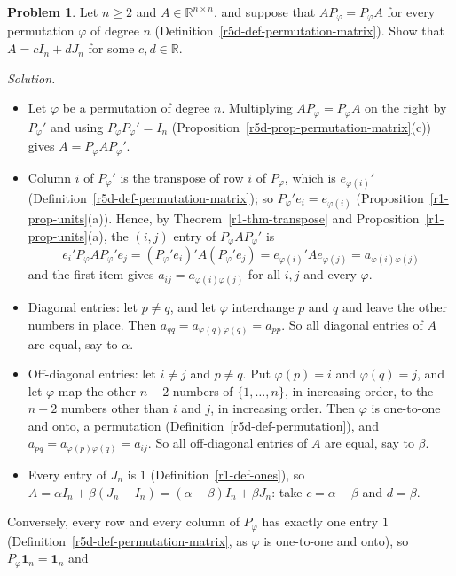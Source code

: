 \documentclass[12pt]{article}
\newcommand{\R}{\mathbb R}
\newcommand{\one}{\mathbf 1}
\theoremstyle{definition}
\newtheorem{problem}{Problem}
\newenvironment{solution}{\par\noindent\textit{Solution.}\ }{\par\smallskip}
\begin{document}
\begin{problem}\label{r5d-ex-pr-perm-commute}
Let \(n\geqslant2\) and \(A\in\R^{n\times n}\), and suppose that \(AP_\varphi=P_\varphi A\) for every permutation \(\varphi\) of
degree \(n\) (Definition~\ref{r5d-def-permutation-matrix}). Show that \(A=cI_n+dJ_n\) for some \(c,d\in\R\).
\end{problem}
\begin{solution}
\begin{itemize}
\item Let \(\varphi\) be a permutation of degree \(n\). Multiplying \(AP_\varphi=P_\varphi A\) on the right by \(P_\varphi'\) and
using \(P_\varphi P_\varphi'=I_n\) (Proposition~\ref{r5d-prop-permutation-matrix}(c)) gives \(A=P_\varphi AP_\varphi'\).
\item Column \(i\) of \(P_\varphi'\) is the transpose of row \(i\) of \(P_\varphi\), which is \(e_{\varphi(i)}'\)
(Definition~\ref{r5d-def-permutation-matrix}); so \(P_\varphi'e_i=e_{\varphi(i)}\) (Proposition~\ref{r1-prop-units}(a)). Hence,
by Theorem~\ref{r1-thm-transpose} and Proposition~\ref{r1-prop-units}(a), the \((i,j)\) entry of \(P_\varphi AP_\varphi'\) is
\[
e_i'P_\varphi AP_\varphi'e_j=(P_\varphi'e_i)'A(P_\varphi'e_j)=e_{\varphi(i)}'Ae_{\varphi(j)}=a_{\varphi(i)\varphi(j)}
\]
and the first item gives \(a_{ij}=a_{\varphi(i)\varphi(j)}\) for all \(i,j\) and every \(\varphi\).
\item Diagonal entries: let \(p\ne q\), and let \(\varphi\) interchange \(p\) and \(q\) and leave the other numbers in place.
Then \(a_{qq}=a_{\varphi(q)\varphi(q)}=a_{pp}\). So all diagonal entries of \(A\) are equal, say to \(\alpha\).
\item Off-diagonal entries: let \(i\ne j\) and \(p\ne q\). Put \(\varphi(p)=i\) and \(\varphi(q)=j\), and let \(\varphi\) map the
other \(n-2\) numbers of \(\{1,\dots,n\}\), in increasing order, to the \(n-2\) numbers other than \(i\) and \(j\), in
increasing order. Then \(\varphi\) is one-to-one and onto, a permutation (Definition~\ref{r5d-def-permutation}), and
\(a_{pq}=a_{\varphi(p)\varphi(q)}=a_{ij}\). So all off-diagonal entries of \(A\) are equal, say to \(\beta\).
\item Every entry of \(J_n\) is \(1\) (Definition~\ref{r1-def-ones}), so
\(A=\alpha I_n+\beta(J_n-I_n)=(\alpha-\beta)I_n+\beta J_n\): take \(c=\alpha-\beta\) and \(d=\beta\).
\end{itemize}
Conversely, every row and every column of \(P_\varphi\) has exactly one entry \(1\)
(Definition~\ref{r5d-def-permutation-matrix}, as \(\varphi\) is one-to-one and onto), so \(P_\varphi\one_n=\one_n\) and

\end{solution}
\end{document}
